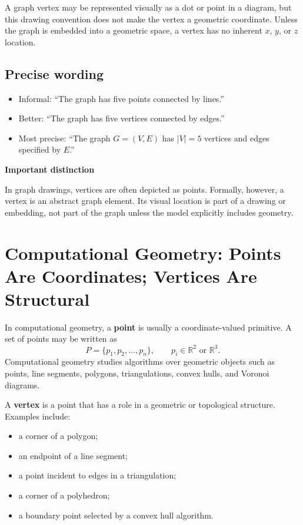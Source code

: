 \documentclass[11pt]{article}
\providecommand{\callout}[2]{%
  \vspace{4pt}%
  \noindent\colorbox{lightaccent}{%
    \parbox{0.965\linewidth}{%
      \textbf{\color{accent}#1}\par
      #2%
    }%
  }%
  \vspace{4pt}%
}
\providecommand{\calloutbox}[2]{\callout{#1}{#2}}
\begin{document}
A graph vertex may be represented visually as a dot or point in a diagram, but this drawing convention does not make the vertex a geometric coordinate. Unless the graph is embedded into a geometric space, a vertex has no inherent \(x\), \(y\), or \(z\) location.

\subsection*{Precise wording}

\begin{itemize}
  \item Informal: ``The graph has five points connected by lines.''
  \item Better: ``The graph has five vertices connected by edges.''
  \item Most precise: ``The graph \(G=(V,E)\) has \(|V|=5\) vertices and edges specified by \(E\).''
\end{itemize}

\calloutbox{Important distinction}{In graph drawings, vertices are often depicted as points. Formally, however, a vertex is an abstract graph element. Its visual location is part of a drawing or embedding, not part of the graph unless the model explicitly includes geometry.}

\section{Computational Geometry: Points Are Coordinates; Vertices Are Structural}

In computational geometry, a \textbf{point} is usually a coordinate-valued primitive. A set of points may be written as
\[
  P = \{p_1,p_2,\ldots,p_n\}, \qquad p_i \in \mathbb{R}^2 \text{ or } \mathbb{R}^3.
\]
Computational geometry studies algorithms over geometric objects such as points, line segments, polygons, triangulations, convex hulls, and Voronoi diagrams.\cite{mount_comp_geom,preparata_shamos_comp_geom}

A \textbf{vertex} is a point that has a role in a geometric or topological structure. Examples include:

\begin{itemize}
  \item a corner of a polygon;
  \item an endpoint of a line segment;
  \item a point incident to edges in a triangulation;
  \item a corner of a polyhedron;
  \item a boundary point selected by a convex hull algorithm.
\end{itemize}
\end{document}

